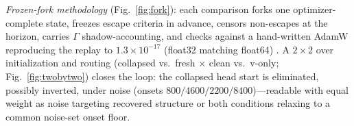 \emph{Frozen-fork methodology} (Fig.~\ref{fig:fork}): each comparison forks one optimizer-complete state, freezes escape criteria in advance, censors non-escapes at the horizon, carries $\Gamma$ shadow-accounting, and checks against a hand-written AdamW reproducing the replay to $1.3{\times}10^{-17}$ (float32 matching float64) \citep{position}. A $2\times2$ over initialization and routing (collapsed vs.\ fresh $\times$ clean vs.\ v-only; Fig.~\ref{fig:twobytwo}) closes the loop: the collapsed head start is eliminated, possibly inverted, under noise (onsets $800/4600/2200/8400$)---readable with equal weight as noise targeting recovered structure or both conditions relaxing to a common noise-set onset floor.